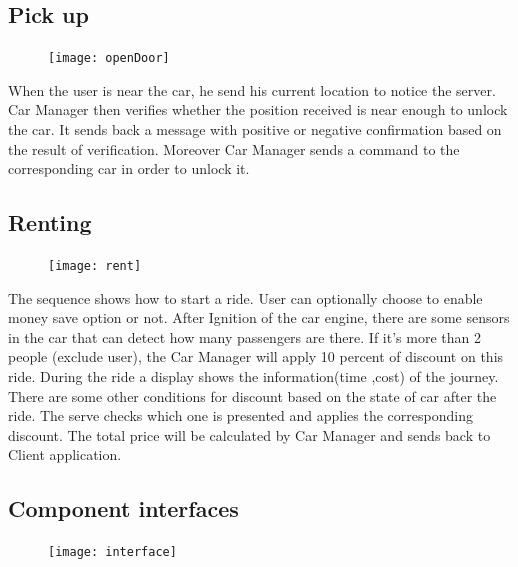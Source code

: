 \documentclass{article}
\begin{document}
	\subsection{Pick up}
	\begin{figure}[h]
		\texttt{[image: openDoor]}
	\end{figure}
	When the user is near the car, he send his current location to notice the server. Car Manager then verifies whether the position received is  near enough to unlock the car. It sends back a message with positive or negative confirmation based on the result of verification. Moreover  Car Manager sends a command to the corresponding car in order to unlock it.
	
	\newpage

	\subsection{Renting}
	\begin{figure}[h]
		\texttt{[image: rent]}
	\end{figure}
	\newpage
	The sequence  shows how to start a ride.  User can optionally  choose to enable money save option or not. After Ignition of the car engine, there are some sensors in the car that can detect how many passengers are there.  If it's more than 2 people (exclude user), the Car Manager will apply 10 percent of discount on this ride. During the ride a display shows the information(time ,cost) of the journey. There are some other conditions for discount based on the state of car after the ride. The serve checks which one is presented and applies the corresponding discount. The total price will be calculated by Car Manager and sends back to Client application.

	\subsection{Component interfaces}
	\begin{figure}[h]
		\texttt{[image: interface]}
	\end{figure}
\end{document}
